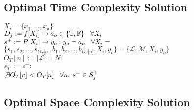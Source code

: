 \documentclass[11pt]{article}
\begin{document}
\subsection{Optimal Time Complexity Solution}
\begin{center}
$
X_i = \{x_1,...,x_n\}
$
\\ \vspace{2mm}
$
D_j := f \lbrack X_i \rbrack \rightarrow a_{o} \in \{\mathbb{T}, \mathbb{F}\} \hspace{3mm} \forall X_i
$
\\ \vspace{2mm}
$
s^+ := P \lbrack X_i \rbrack \rightarrow y_{o} : y_o = a_{o} \hspace{3mm} \forall X_i = 
$
\\ \vspace{2mm}
$
\{ s_1,s_2,...,s_{O_T \lbrack n \rbrack }, b_1, b_2,...,b_{O_S \lbrack n \rbrack},X_i,y_o \} = \{ \mathcal{L},\mathcal{M},X_i,y_o\}
$
\\ \vspace{3mm}
$
O_T[n] := |\mathcal{L}| = N
$
\\ \vspace{2mm}
$
s_{T}^+ := s^+ :
$
\\ \vspace{2mm}
$
\not \exists \hat{O_T} \lbrack n \rbrack < O_{T}[n] \hspace{3mm} \forall n, \hspace{1mm}  s^+ \in S_j^+
$
\end{center}




\subsection{Optimal Space Complexity Solution}
\end{document}

